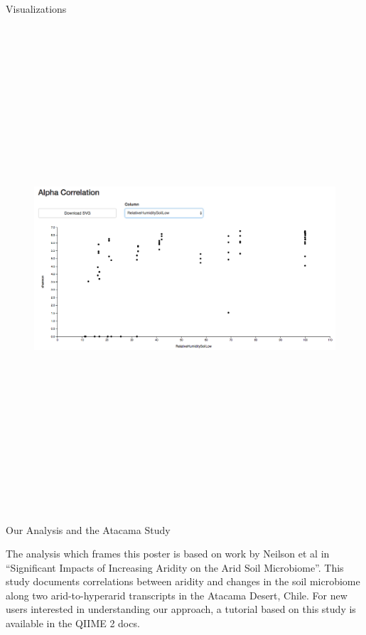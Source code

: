 \documentclass[final]{beamer}
\newlength{\colwidth}
\begin{document}
\begin{frame}[t]
\begin{columns}[t]
\begin{column}{\colwidth}
\begin{block}{Visualizations}
    \begin{figure}[tph!]
      {\includegraphics[height=18cm]{assets/alpha-correlation}}
    \end{figure}



  \end{block}

  \begin{block}{Our Analysis and the Atacama Study}

    The analysis which frames this poster is based on work by Neilson et al in
    “Significant Impacts of Increasing Aridity on the Arid Soil Microbiome”\cite{Neilsone00195-16}.
    This study documents correlations between aridity and changes in the soil
    microbiome along two arid-to-hyperarid transcripts in the Atacama Desert,
    Chile. For new users interested in understanding our approach, a tutorial
    based on this study is available in the QIIME 2 docs. 


\end{block}
\end{column}
\end{columns}
\end{frame}
\end{document}
